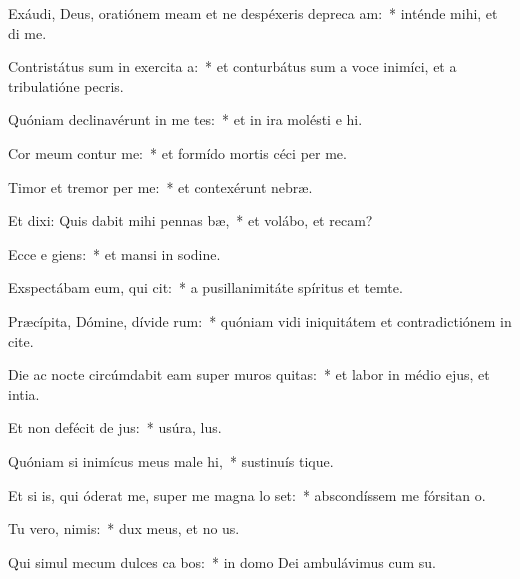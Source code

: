 \item Exáudi, Deus, oratiónem meam et ne despéxeris depreca am:~* inténde mihi, et di me.
\item Contristátus sum in exercita a:~* et conturbátus sum a voce inimíci, et a tribulatióne pecris.
\item Quóniam declinavérunt in me tes:~* et in ira molésti e hi.
\item Cor meum contur   me:~* et formído mortis céci per me.
\item Timor et tremor  per me:~* et contexérunt  nebræ.
\item Et dixi: Quis dabit mihi pennas  bæ,~* et volábo, et recam?
\item Ecce e giens:~* et mansi in sodine.
\item Exspectábam eum, qui   cit:~* a pusillanimitáte spíritus et temte.
\item Præcípita, Dómine, dívide  rum:~* quóniam vidi iniquitátem et contradictiónem in cite.
\item Die ac nocte circúmdabit eam super muros  quitas:~* et labor in médio ejus, et intia.
\item Et non defécit de  jus:~* usúra,  lus.
\item Quóniam si inimícus meus male hi,~* sustinuís tique.
\item Et si is, qui óderat me, super me magna lo set:~* abscondíssem me fórsitan  o.
\item Tu vero,  nimis:~* dux meus, et no us.
\item Qui simul mecum dulces ca bos:~* in domo Dei ambulávimus cum su.
